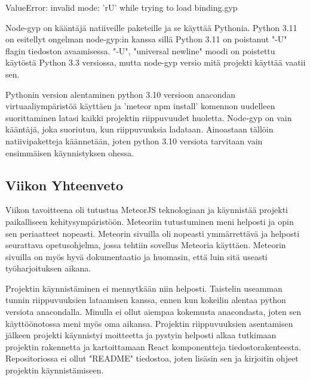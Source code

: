 \documentclass[11pt,a4paper,titlepage,oneside]{article}
\begin{document}
\begin{tcolorbox}
ValueError: invalid mode: 'rU' while trying to load binding.gyp
\end{tcolorbox}\medskip


Node-gyp on kääntäjä natiiveille paketeille ja se käyttää Pythonia.
Python 3.11 on esitellyt ongelman node-gyp:in kanssa sillä Python 3.11 on poistanut "-U" flagin tiedoston avaamisessa.
"-U", "universal newline" moodi on poistettu käytöstä Python 3.3 versiossa, mutta node-gyp versio mitä projekti käyttää vaatii sen.\medskip



Pythonin version alentaminen python 3.10 versioon anacondan virtuaaliympäristöä käyttäen ja 'meteor npm install' komennon uudelleen suorittaminen latasi kaikki projektin riippuvuudet huoletta.
Node-gyp on vain kääntäjä, joka suoriutuu, kun riippuvuuksia ladataan. Ainoastaan tällöin natiivipaketteja käännetään, joten python 3.10 versiota tarvitaan vain ensimmäisen käynnistyksen ohessa.
\medskip


\subsection*{Viikon Yhteenveto}
Viikon tavoitteena oli tutustua MeteorJS teknologiaan ja käynnistää projekti paikalliseen kehitysympäristöön.
Meteoriin tutustuminen meni helposti ja opin sen periaatteet nopeasti. Meteorin sivuilla oli nopeasti ymmärrettävä ja helposti seurattava opetusohjelma, jossa tehtiin sovellus Meteoria käyttäen.
Meteorin sivuilla on myös hyvä dokumentaatio ja huomasin, että luin sitä useasti työharjoituksen aikana. \medskip

Projektin käynnistäminen ei mennytkään niin helposti. Taistelin useamman tunnin riippuvuuksien lataamisen kanssa, ennen kun kokeilin alentaa python versiota anacondalla. Minulla ei ollut aiempaa kokemusta anacondasta, joten sen käyttöönotossa meni myös oma aikansa.
Projektin riippuvuuksien asentamisen jälkeen projekti käynnistyi moitteetta ja pystyin helposti alkaa tutkimaan projektin rakennetta ja kartoittamaan React komponentteja tiedostorakenteesta. Repositoriossa ei ollut "README" tiedostoa, joten lisäsin sen ja kirjoitin ohjeet projektin käynnistämiseen.
\end{document}
